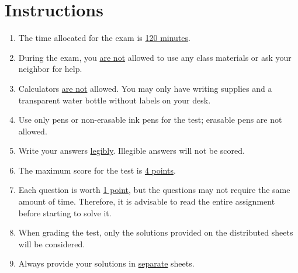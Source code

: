 \section*{Instructions}
\begin{enumerate}
    \item The time allocated for the exam is \underline{120 minutes}.
    \item During the exam, you \underline{are not} allowed to use any class materials or ask your neighbor for help.
    \item Calculators \underline{are not} allowed. You may only have writing supplies and a transparent water bottle without labels on your desk.
    \item Use only pens or non-erasable ink pens for the test; erasable pens are not allowed.
    \item Write your answers \underline{legibly}. Illegible answers will not be scored.
    \item The maximum score for the test is \underline{4 points}.
    \item Each question is worth \underline{1 point}, but the questions may not require the same amount of time. Therefore, it is advisable to read the entire assignment before starting to solve it. 
    \item When grading the test, only the solutions provided on the distributed sheets will be considered.
    \item Always provide your solutions in \underline{separate} sheets.
    \vfill
\end{enumerate}